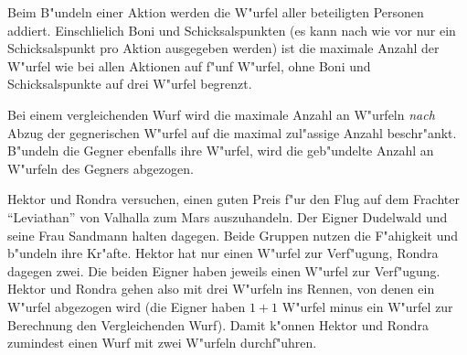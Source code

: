 Beim B"undeln einer Aktion werden die W"urfel aller beteiligten Personen addiert. Einschlie\3lich Boni und Schicksalspunkten (es kann nach wie vor nur ein Schicksalspunkt pro Aktion ausgegeben werden) ist die maximale Anzahl der W"urfel wie bei allen Aktionen auf f"unf W"urfel, ohne Boni und Schicksalspunkte auf drei W"urfel begrenzt.

Bei einem vergleichenden Wurf wird die maximale Anzahl an W"urfeln \emph{nach} Abzug der gegnerischen W"urfel auf die maximal zul"assige Anzahl beschr"ankt. B"undeln die Gegner ebenfalls ihre W"urfel, wird die geb"undelte Anzahl an W"urfeln des Gegners abgezogen.

\medskip
\begin{ruleexample}
    Hektor und Rondra versuchen, einen guten Preis f"ur den Flug auf dem Frachter "`Leviathan"' von Valhalla zum Mars auszuhandeln. Der Eigner Dudelwald und seine Frau Sandmann halten dagegen. Beide Gruppen nutzen die F"ahigkeit  und b"undeln ihre Kr"afte. Hektor hat nur einen W"urfel zur Verf"ugung, Rondra dagegen zwei. Die beiden Eigner haben jeweils einen W"urfel zur Verf"ugung. Hektor und Rondra gehen also mit drei W"urfeln ins Rennen, von denen ein W"urfel abgezogen wird (die Eigner haben $1+1$ W"urfel minus ein W"urfel zur Berechnung den Vergleichenden Wurf). Damit k"onnen Hektor und Rondra zumindest einen Wurf mit zwei W"urfeln durchf"uhren.
\end{ruleexample}
